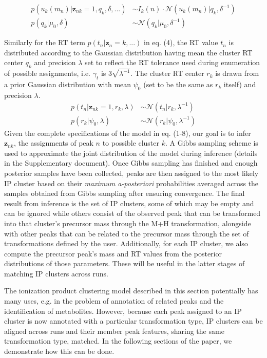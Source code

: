 \begin{align}
p(u_k(m_n)\vert\boldsymbol{z}_{nk}=1,q_k,\delta,...) &\sim I_k(n) \cdot \mathcal{N}(u_k(m_n) \vert q_k,\delta^{-1}) \\
p(q_k\vert \mu_0,\delta) &\sim \mathcal{N}(q_k \vert \mu_0,\delta^{-1})
\end{align}

Similarly for the RT term $p(t_n\vert\boldsymbol{z}_n=k,...)$ in eq. (4), the RT value $t_n$ is distributed according to the Gaussian distribution having mean the cluster RT center $q_k$ and precision $\lambda$ set to reflect the RT tolerance used during enumeration of possible assignments, i.e. $\gamma_t$ is $3\sqrt{\lambda^{-1}}$. The cluster RT center $r_k$ is drawn from a prior Gaussian distribution with mean $\psi_0$ (set to be the same as $r_k$ itself) and precision $\lambda$.
\begin{align}
p(t_n\vert\boldsymbol{z}_{nk}=1,r_k,\lambda) &\sim \mathcal{N}(t_n \vert r_k,\lambda^{-1}) \\
p(r_k\vert \psi_0,\lambda) &\sim \mathcal{N}(r_k \vert \psi_0,\lambda^{-1})
\end{align}
Given the complete specifications of the model in eq. (1-8), our goal is to infer $\boldsymbol{z}_{nk}$, the assignments of peak $n$ to possible cluster $k$. A Gibbs sampling scheme \cite{Rogers2011} is used to approximate the joint distribution of the model during inference (details in the Supplementary document). Once Gibbs sampling has finished and enough posterior samples have been collected, peaks are then assigned to the most likely IP cluster based on their \textit{maximum a-posteriori} probabilities averaged across the samples obtained from Gibbs sampling after ensuring convergence. The final result from inference is the set of IP clusters, some of which may be empty and can be ignored while others consist of the observed peak that can be transformed into that cluster's precursor mass through the M+H transformation, alongside with other peaks that can be related to the precursor mass through the set of transformations defined by the user. Additionally, for each IP cluster, we also compute the precursor peak's mass and RT values from the posterior distributions of those parameters. These will be useful in the latter stages of matching IP clusters across runs.

The ionization product clustering model described in this section potentially has many uses, e.g. in the problem of annotation of related peaks and the identification of metabolites. However, because each peak assigned to an IP cluster is now annotated with a particular transformation type, IP clusters can be aligned across runs and their member peak features, sharing the same transformation type, matched. In the following sections of the paper, we demonstrate how this can be done. 

